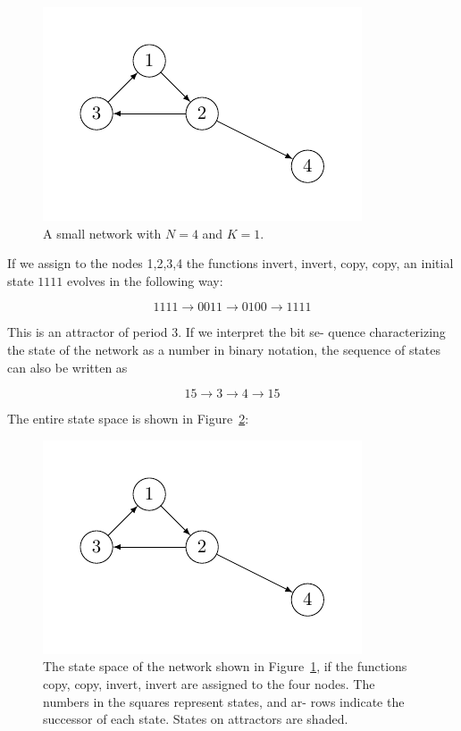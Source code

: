 \begin{figure}[h]
\centering
\includegraphics[scale=1]{figurenetworks2.pdf}
\caption{A small network with $N=4$ and $K=1$.}
\label{fig:rb2}
\end{figure}

If we assign to the nodes 1,2,3,4 the functions invert,
invert, copy, copy, an initial state $1111$ evolves in the
following way:

$$
1111 \to 0011 \to 0100 \to 1111
$$

This is an attractor of period 3. If we interpret the bit se-
quence characterizing the state of the network as a number in binary notation, the sequence of states can also be
written as

$$
15 \to 3 \to 4 \to 15
$$

The entire state space is shown in Figure~\ref{fig:rb3}:
\begin{figure}[h]
\centering
\includegraphics[scale=1]{figurenetworks2.pdf}
\caption{The state space of the network shown in Figure~\ref{fig:rb2}, if
the functions copy, copy, invert, invert are assigned to the four
nodes. The numbers in the squares represent states, and ar-
rows indicate the successor of each state. States on attractors
are shaded.}
\label{fig:rb3}
\end{figure}

